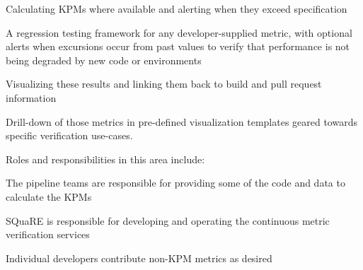 \begin{itemize_single}

\item Calculating KPMs where available and alerting when they exceed specification
  
\item A regression testing framework for any developer-supplied metric, with optional alerts when excursions occur from past values to verify that performance is not being degraded by new code or environments

\item Visualizing these results and linking them back to build and pull request information

\item  Drill-down of those metrics in pre-defined visualization templates geared towards specific verification use-cases.

Roles and responsibilities in this area include:
 
\item The pipeline teams  are responsible for providing some of the code and data to calculate the KPMs
  
\item SQuaRE is responsible for developing and operating the continuous metric verification services

\item Individual developers contribute non-KPM metrics as desired

\end{itemize_single}
